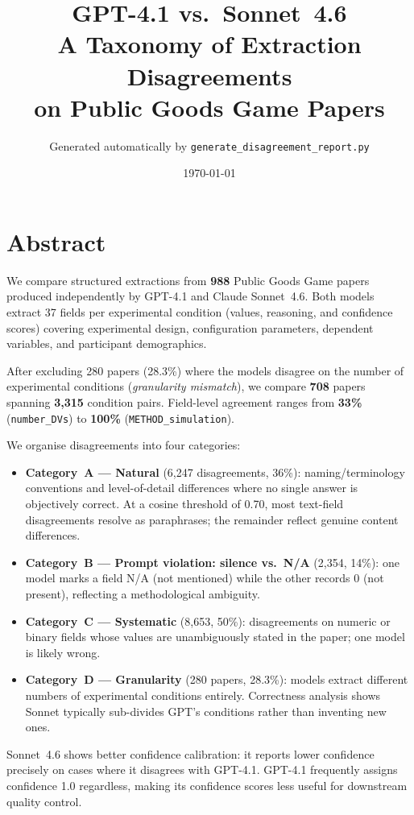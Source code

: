 \documentclass[11pt,a4paper]{article}
\title{\textbf{GPT-4.1 vs.\ Sonnet~4.6}\\[4pt]
       \large A Taxonomy of Extraction Disagreements\\
       on Public Goods Game Papers}
\author{Generated automatically by \texttt{generate\_disagreement\_report.py}}
\date{\today}
\begin{document}
\maketitle
\tableofcontents
\newpage

\section*{Abstract}
We compare structured extractions from \textbf{988} Public Goods
Game papers produced independently by GPT-4.1 and Claude Sonnet~4.6.  Both
models extract 37 fields per experimental condition (values, reasoning, and
confidence scores) covering experimental design, configuration parameters,
dependent variables, and participant demographics.

After excluding 280 papers (28.3\%) where the models
disagree on the number of experimental conditions (\emph{granularity mismatch}),
we compare \textbf{708} papers spanning \textbf{3,315}
condition pairs.  Field-level agreement ranges from
\textbf{33\%}
(\texttt{number\_DVs}) to
\textbf{100\%}
(\texttt{METHOD\_simulation}).

We organise disagreements into four categories:
\begin{itemize}
  \item \textbf{Category~A --- Natural} (6,247 disagreements, 36\%):
    naming/terminology conventions and level-of-detail differences where no
    single answer is objectively correct.  At a cosine threshold of 0.70,
    most text-field disagreements resolve as paraphrases; the remainder reflect
    genuine content differences.
  \item \textbf{Category~B --- Prompt violation: silence vs.\ N/A} (2,354, 14\%):
    one model marks a field N/A (not mentioned) while the other records 0
    (not present), reflecting a methodological ambiguity.
  \item \textbf{Category~C --- Systematic} (8,653, 50\%):
    disagreements on numeric or binary fields whose values are unambiguously
    stated in the paper; one model is likely wrong.
  \item \textbf{Category~D --- Granularity} (280 papers, 28.3\%):
    models extract different numbers of experimental conditions entirely.
    Correctness analysis shows Sonnet typically sub-divides GPT's conditions
    rather than inventing new ones.
\end{itemize}

Sonnet~4.6 shows better confidence calibration: it reports lower confidence
precisely on cases where it disagrees with GPT-4.1.  GPT-4.1 frequently
assigns confidence 1.0 regardless, making its confidence scores less useful
for downstream quality control.
\end{document}
